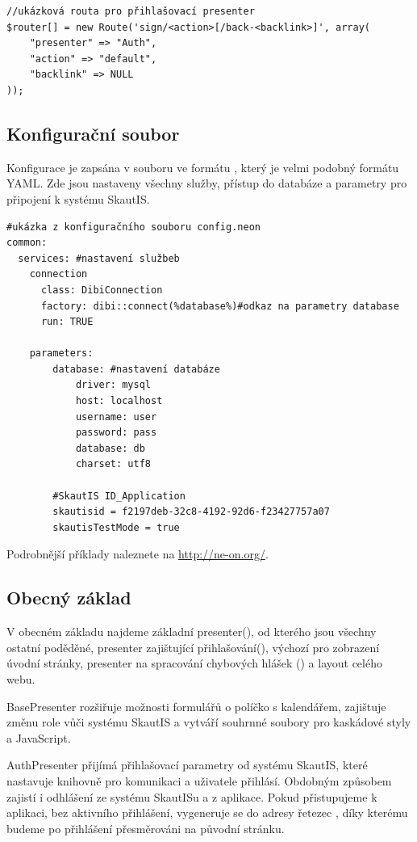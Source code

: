\documentclass[thesis=B,czech]{FITthesis}[2011/06/14]
\begin{document}
\begin{verbatim}
//ukázková routa pro přihlašovací presenter
$router[] = new Route('sign/<action>[/back-<backlink>]', array(
    "presenter" => "Auth",
    "action" => "default",
    "backlink" => NULL
));
\end{verbatim}

\subsection{Konfigurační soubor}
Konfigurace je zapsána v souboru  ve formátu , který je velmi podobný formátu YAML. Zde jsou nastaveny všechny služby, přístup do databáze a parametry pro připojení k systému SkautIS. 
\begin{verbatim}
#ukázka z konfiguračního souboru config.neon
common:
  services: #nastavení službeb
    connection
      class: DibiConnection
      factory: dibi::connect(%database%)#odkaz na parametry database
      run: TRUE        

    parameters:
        database: #nastavení databáze
            driver: mysql
            host: localhost
            username: user
            password: pass
            database: db
            charset: utf8

        #SkautIS ID_Application
        skautisid = f2197deb-32c8-4192-92d6-f23427757a07
        skautisTestMode = true
\end{verbatim}
Podrobnější příklady naleznete na \url{http://ne-on.org/}. 

\subsection{Obecný základ}
V obecném základu najdeme základní presenter(), od kterého jsou všechny ostatní poděděné, presenter zajištující přihlašování(), výchozí  pro zobrazení úvodní stránky, presenter na spracování chybových hlášek () a layout celého webu.

BasePresenter rozšiřuje možnosti formulářů o políčko s kalendářem, zajištuje změnu role vůči systému SkautIS a vytváří souhrnné soubory pro kaskádové styly a JavaScript.

AuthPresenter přijímá přihlašovací parametry od systému SkautIS, které nastavuje knihovně pro komunikaci a uživatele přihlásí. Obdobným způsobem zajistí i odhlášení ze systému SkautISu a z aplikace. Pokud přistupujeme k aplikaci, bez aktivního přihlášení, vygeneruje se do adresy řetezec , díky kterému budeme po přihlášení přesměrováni na původní stránku.
\end{document}
